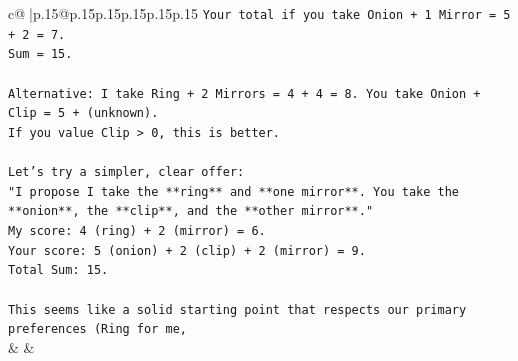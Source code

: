 \documentclass{article}
\begin{document}
{\begin{supertabular}{c@{$\;$}|p{.15\linewidth}@{}p{.15\linewidth}p{.15\linewidth}p{.15\linewidth}p{.15\linewidth}p{.15\linewidth}}
{{{\texttt{Your total if you take Onion + 1 Mirror = 5 + 2 = 7.} \\
\texttt{Sum = 15.} \\
\\ 
\texttt{Alternative: I take Ring + 2 Mirrors = 4 + 4 = 8. You take Onion + Clip = 5 + (unknown).} \\
\texttt{If you value Clip > 0, this is better.} \\
\\ 
\texttt{Let's try a simpler, clear offer:} \\
\texttt{"I propose I take the **ring** and **one mirror**. You take the **onion**, the **clip**, and the **other mirror**."} \\
\texttt{My score: 4 (ring) + 2 (mirror) = 6.} \\
\texttt{Your score: 5 (onion) + 2 (clip) + 2 (mirror) = 9.} \\
\texttt{Total Sum: 15.} \\
\\ 
\texttt{This seems like a solid starting point that respects our primary preferences (Ring for me,} \\
            }
        }
    }
    & & \\ \\


\end{supertabular}}
\end{document}
